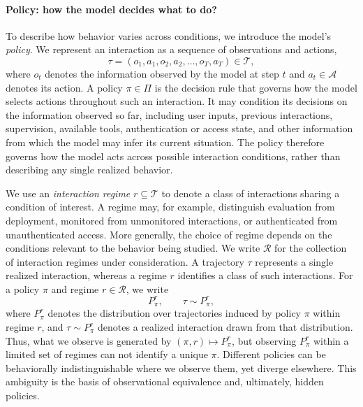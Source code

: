 \documentclass{article}
\newcommand{\Rint}{\mathcal{R}}
\newcommand{\Act}{\mathcal{A}}
\newcommand{\Traj}{\mathcal{T}}
\begin{document}
\paragraph{Policy: how the model decides what to do?}
To describe how behavior varies across conditions, we introduce the model's \emph{policy}. We represent an interaction as a sequence of observations and actions,
\begin{equation}
\tau=(o_1,a_1,o_2,a_2,\ldots,o_T,a_T)\in\Traj,
\end{equation}
where $o_t$ denotes the information observed by the model at step $t$ and $a_t\in\Act$ denotes its action. A policy $\pi\in\Pi$ is the decision rule that governs how the model selects actions throughout such an interaction. It may condition its decisions on the information observed so far, including user inputs, previous interactions, supervision, available tools, authentication or access state, and other information from which the model may infer its current situation. The policy therefore governs how the model acts across possible interaction conditions, rather than describing any single realized behavior.

We use an \emph{interaction regime} $r\subseteq\Traj$ to denote a class of interactions sharing a condition of interest. A regime may, for example, distinguish evaluation from deployment, monitored from unmonitored interactions, or authenticated from unauthenticated access. More generally, the choice of regime depends on the conditions relevant to the behavior being studied. We write $\Rint$ for the collection of interaction regimes under consideration. A trajectory $\tau$ represents a single realized interaction, whereas a regime $r$ identifies a class of such interactions. For a policy $\pi$ and regime $r\in\Rint$, we write
\begin{equation}
P_{\pi}^{r},
\qquad
\tau\sim P_{\pi}^{r},
\end{equation}
where $P_{\pi}^{r}$ denotes the distribution over trajectories induced by policy $\pi$ within regime $r$, and $\tau\sim P_{\pi}^{r}$ denotes a realized interaction drawn from that distribution. Thus, what we observe is generated by $(\pi,r)\longmapsto P_{\pi}^{r}$, but observing $P_{\pi}^{r}$ within a limited set of regimes can not identify a unique $\pi$. Different policies can be behaviorally indistinguishable where we observe them, yet diverge elsewhere. This ambiguity is the basis of observational equivalence and, ultimately, hidden policies.

\end{document}

